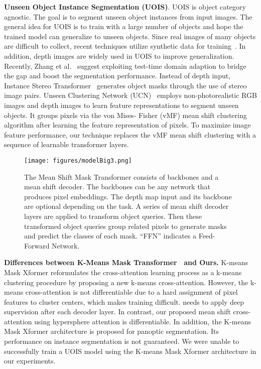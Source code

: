 \documentclass[letterpaper, 10 pt, conference]{ieeeconf}
\begin{document}
\textbf{Unseen Object Instance Segmentation (UOIS)}. UOIS is object category agnostic. The goal is to segment unseen object instances from input images. The general idea for UOIS is to train with a large number of objects and hope the trained model can generalize to unseen objects. Since real images of many objects are difficult to collect, recent techniques utilize synthetic data for training~\cite{shao2018clusternet, xie2020best, danielczuk2019segmenting}. In addition, depth images are widely used in UOIS to improve generalization. Recently, Zhang et al.~\cite{zhang2022unseen} suggest exploiting test-time domain adaption to bridge the gap and boost the segmentation performance. Instead of depth input, Instance Stereo Transformer~\cite{durner2021unknown} generates object masks through the use of stereo image pairs. Unseen Clustering Network (UCN)~\cite{xiang2020learning} employs non-photorealistic RGB images and depth images to learn feature representations to segment unseen objects. It groups pixels via the von Mises-
Fisher (vMF) mean shift clustering algorithm after learning the feature representation of pixels. To maximize image feature performance, our technique replaces the vMF mean shift clustering with a sequence of learnable transformer layers. 

\begin{figure*}
    \vspace{-6mm}
    \centering
\texttt{[image: figures/modelBig3.png]}
    \vspace{-4mm}
    \caption{The Mean Shift Mask Transformer consists of backbones and a mean shift decoder. The backbones can be any network that produces pixel embeddings. The depth map input and its backbone are optional depending on the task. A series of mean shift decoder layers are applied to transform  object queries. Then these transformed object queries group related pixels to generate masks and predict the classes of each mask. ``FFN'' indicates a Feed-Forward Network. }
    \label{fig:model}
    \vspace{-6mm}
\end{figure*}

\textbf{Differences between K-Means Mask Transformer~\cite{yu2022k} and Ours.}  K-means Mask Xformer \cite{yu2022k} reformulates the cross-attention learning process as a k-means clustering procedure by proposing a new k-means cross-attention. However, the k-means cross-attention is not differentiable due to a hard assignment of pixel features to cluster centers, which makes training difficult. \cite{yu2022k} needs to apply deep supervision after each decoder layer. In contrast, our proposed mean shift cross-attention using hypersphere attention is differentiable. In addition, the K-means Mask Xformer architecture is proposed for panoptic segmentation. Its performance on instance segmentation is not guaranteed. We were unable to successfully train a UOIS model using the K-means Mask Xformer architecture in our experiments.
\end{document}
